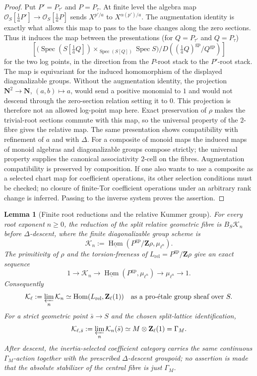 \documentclass[11pt]{article}
\newtheorem{lemma}[theorem]{Lemma}
\theoremstyle{definition}
\theoremstyle{remark}
\begin{document}
\begin{proof}
Put $P'=P_{\tau'}$ and $P=P_\tau$.  At finite level the algebra map
$\mathcal O_S[\tfrac1aP']\to\mathcal O_S[\tfrac1aP]$
sends $X^{p'/a}$ to $X^{\alpha(p')/a}$.
The augmentation identity is exactly what allows this map to pass
to the base changes along the zero sections.  Thus it induces the
map between the presentations (for
$Q=P_{\tau'}$ and $Q=P_\tau$)
\[
 \left[\bigl(\operatorname{Spec}(S[\tfrac1aQ])
       \times_{\operatorname{Spec}(S[Q])}\operatorname{Spec}S\bigr)
       /D((\tfrac1aQ)^{\mathrm{gp}}/Q^{\mathrm{gp}})\right]
\]
for the two log points, in the direction from the $P$-root stack
to the $P'$-root stack.  The map is equivariant for the induced
homomorphism of the displayed diagonalizable groups.  Without the
augmentation identity, the projection $\mathbf N^2\to\mathbf N$,
$(a,b)\mapsto a$, would send a positive monomial to $1$ and would
not descend through the zero-section relation setting it to $0$.
This projection is therefore not an allowed log-point map here.
Exact preservation of $\rho$ makes the trivial-root
sections commute with this map, so the universal property of the $2$-fibre
gives the relative map.  The same presentation shows compatibility with
 refinement of $a$ and with $\Delta$.  For a composite of monoid maps the
induced maps of monoid algebras and diagonalizable groups compose strictly;
the universal property supplies the canonical associativity $2$-cell on the
fibres.  Augmentation compatibility is preserved by composition.
If one also wants to use a composite as a selected chart map for
coefficient operations, its other selection conditions must be
checked; no closure of finite-Tor coefficient operations under an
arbitrary rank change is inferred.  Passing to the inverse system
proves the assertion.
\end{proof}

\begin{lemma}[Finite root reductions and the relative Kummer group]
\label{lem:frag-root-levels}
For every root exponent $n\geq0$, the reduction of the split relative
geometric fibre is $B_S\mathcal K_n$ before $\Delta$-descent, where the finite
diagonalizable group scheme is
\[
 \mathcal K_n
 :=\underline{\operatorname{Hom}}
       (P^{\mathrm{gp}}/\mathbf Z\rho,\mu_{\ell^n}).
\]
The primitivity of $\rho$ and the torsion-freeness of
$L_{\mathrm{rel}}=P^{\mathrm{gp}}/\mathbf Z\rho$ give an exact sequence
\[
 1\longrightarrow \mathcal K_n\longrightarrow
 \underline{\operatorname{Hom}}(P^{\mathrm{gp}},\mu_{\ell^n})
 \longrightarrow\mu_{\ell^n}\longrightarrow1.
\]
Consequently
\[
 \mathcal K_\ell:=\varprojlim_n\mathcal K_n
 \simeq \operatorname{Hom}(L_{\mathrm{rel}},\mathbf Z_\ell(1))
 \quad\text{as a pro-\'{e}tale group sheaf over }S.
\]
For a strict geometric point $\bar s\to S$ and the chosen split-lattice
identification,
\[
 \mathcal K_{\ell,\bar s}
 :=\varprojlim_n\mathcal K_n(\bar s)
 \simeq M\otimes\mathbf Z_\ell(1)=\Gamma_M.
\]
After descent, the inertia-selected coefficient category carries the same continuous
$\Gamma_M$-action together with the prescribed $\Delta$-descent groupoid; no
assertion is made that the absolute stabilizer of the central fibre is just
$\Gamma_M$.
\end{lemma}
\end{document}
